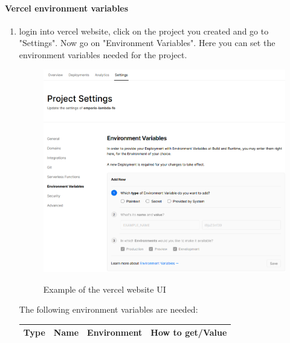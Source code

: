 \paragraph{Vercel environment variables}
\begin{enumerate}
\item login into vercel website, click on the project you created and go to "Settings". Now go on "Environment Variables". Here you can set the environment variables needed for the project.\\
\begin{figure}[H]
\centering
\includegraphics[scale=0.55]{res/Setup/Configurazione/img/settingsEnvVar}\\
\caption{Example of the vercel website UI}
\end{figure}
The following environment variables are needed:\\
\setcounter{table}{-1}
{
\centering
\renewcommand{\arraystretch}{1.5}
\begin{longtable}{c C{6cm} C{3cm} C{5cm}}
\textbf{Type} &
\textbf{Name} &
\textbf{Environment} &
\textbf{How to get/Value}\\
\endhead


\end{longtable}}
\end{enumerate}
